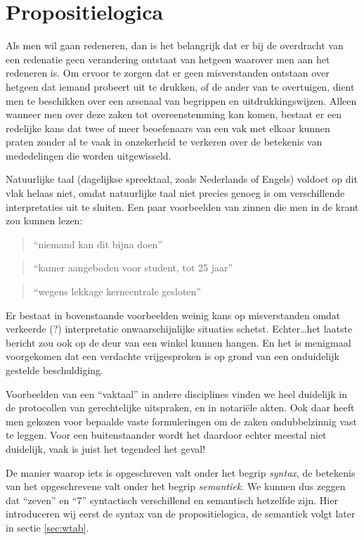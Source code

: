 \chapter{Propositielogica}\label{ch:proposities}
Als men wil gaan redeneren, dan is het belangrijk dat er bij de overdracht van een redenatie geen verandering ontstaat van hetgeen waarover men aan het redeneren is. Om ervoor te zorgen dat er geen misverstanden ontstaan over hetgeen dat iemand probeert uit te drukken, of de ander van te overtuigen, dient men te beschikken over een arsenaal van begrippen en uitdrukkingswijzen. Alleen wanneer men over deze zaken tot overeenstemming kan komen, bestaat er een redelijke kans dat twee of meer beoefenaars van een vak met elkaar kunnen praten zonder al te vaak in onzekerheid te verkeren over de betekenis van mededelingen die worden uitgewisseld.

Natuurlijke taal (dagelijkse spreektaal, zoals Nederlands of Engels) voldoet op dit vlak helaas niet, omdat natuurlijke taal niet precies genoeg is om verschillende interpretaties uit te sluiten. Een paar voorbeelden van zinnen die men in de krant zou kunnen lezen:
\begin{quote}
\enquote{niemand kan dit bijna doen}
\end{quote}
\begin{quote}
\enquote{kamer aangeboden voor student, tot 25 jaar}
\end{quote}
\begin{quote}
\enquote{wegens lekkage kerncentrale gesloten}
\end{quote}

Er bestaat in bovenstaande voorbeelden weinig kans op misverstanden omdat verkeerde (?) interpretatie onwaarschijnlijke situaties schetst. Echter\ldots het laatste bericht zou ook op de deur van een winkel kunnen hangen. En het is menigmaal voorgekomen dat een verdachte vrijgesproken is op grond van een onduidelijk gestelde beschuldiging.

Voorbeelden van een \enquote{vaktaal} in andere disciplines vinden we heel duidelijk in de protocollen van gerechtelijke uitspraken, en in notari\"ele akten. Ook daar heeft men gekozen voor bepaalde vaste formuleringen om de zaken ondubbelzinnig vast te leggen. Voor een buitenstaander wordt het daardoor echter meestal niet duidelijk, vaak is juist het tegendeel het geval!

De manier waarop iets is opgeschreven valt onder het begrip \textit{syntax}, de betekenis van het opgeschrevene valt onder het begrip \textit{semantiek}. We kunnen dus zeggen dat \enquote{zeven} en \enquote{7} syntactisch verschillend en semantisch hetzelfde zijn. Hier introduceren wij eerst de syntax van de propositielogica, de semantiek volgt later in sectie \ref{sec:wtab}.

